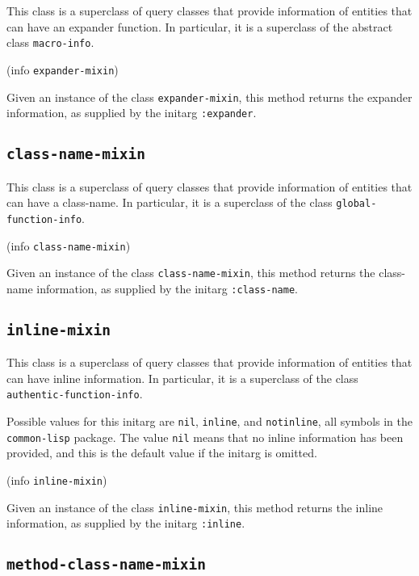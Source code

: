 This class is a superclass of query classes that provide information
of entities that can have an expander function.  In particular, it is
a superclass of the abstract class \texttt{macro-info}.


 {(info {\tt expander-mixin})}

Given an instance of the class \texttt{expander-mixin}, this method
returns the expander information, as supplied by the initarg
\texttt{:expander}.

\subsection{\texttt{class-name-mixin}}

This class is a superclass of query classes that provide information
of entities that can have a class-name.  In particular, it is a
superclass of the class \texttt{global-function-info}.


 {(info {\tt class-name-mixin})}

Given an instance of the class \texttt{class-name-mixin}, this method
returns the class-name information, as supplied by the initarg
\texttt{:class-name}.

\subsection{\texttt{inline-mixin}}

This class is a superclass of query classes that provide information
of entities that can have inline information.  In particular, it is a
superclass of the class \texttt{authentic-function-info}.


Possible values for this initarg are \texttt{nil}, \texttt{inline},
and \texttt{notinline}, all symbols in the \texttt{common-lisp}
package.  The value \texttt{nil} means that no inline information has
been provided, and this is the default value if the initarg is omitted.

 {(info {\tt inline-mixin})}

Given an instance of the class \texttt{inline-mixin}, this method
returns the inline information, as supplied by the initarg
\texttt{:inline}.

\subsection{\texttt{method-class-name-mixin}}

